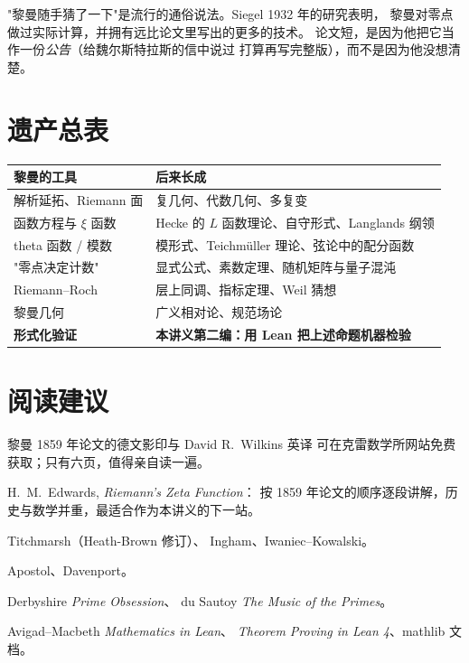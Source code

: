 \begin{histbox}[一个常被误解的故事]
"黎曼随手猜了一下"是流行的通俗说法。Siegel 1932 年的研究表明，
黎曼对零点做过实际计算，并拥有远比论文里写出的更多的技术。
论文短，是因为他把它当作一份\emph{公告}（给魏尔斯特拉斯的信中说过
打算再写完整版），而不是因为他没想清楚。
\end{histbox}

\section{遗产总表}
\label{sec:05-table}

\begin{center}\small
\begin{tabular}{@{}p{}p{}@{}}
\toprule
\textbf{黎曼的工具} & \textbf{后来长成}\\
\midrule
解析延拓、Riemann 面 & 复几何、代数几何、多复变\\
函数方程与 $\xi$ 函数 & Hecke 的 $L$ 函数理论、自守形式、Langlands 纲领\\
theta 函数 / 模数 & 模形式、Teichm\"uller 理论、弦论中的配分函数\\
"零点决定计数" & 显式公式、素数定理、随机矩阵与量子混沌\\
Riemann--Roch & 层上同调、指标定理、Weil 猜想\\
黎曼几何 & 广义相对论、规范场论\\
\textbf{形式化验证} & \textbf{本讲义第二编：用 Lean 把上述命题机器检验}\\
\bottomrule
\end{tabular}
\end{center}

\section{阅读建议}
\label{sec:05-reading}

\begin{description}[leftmargin=2.2em]
  \item[原始文献] 黎曼 1859 年论文的德文影印与 David R.\ Wilkins 英译
        可在克雷数学所网站免费获取\cite{claymanuscript}；只有六页，值得亲自读一遍。
  \item[最佳注释本] H.\ M.\ Edwards, \emph{Riemann's Zeta Function}\cite{edwards2001}：
        按 1859 年论文的顺序逐段讲解，历史与数学并重，最适合作为本讲义的下一站。
  \item[标准参考] Titchmarsh（Heath-Brown 修订）\cite{titchmarsh1986}、
        Ingham\cite{ingham1932}、Iwaniec--Kowalski\cite{iwaniec2004}。
  \item[入门教材] Apostol\cite{apostol1976}、Davenport\cite{davenport2000}。
  \item[通俗读物] Derbyshire \emph{Prime Obsession}\cite{derbyshire2003}、
        du Sautoy \emph{The Music of the Primes}。
  \item[Lean] Avigad--Macbeth \emph{Mathematics in Lean}\cite{mil2023}、
        \emph{Theorem Proving in Lean 4}\cite{lean4ref}、mathlib 文档\cite{mathlib4}。
\end{description}


